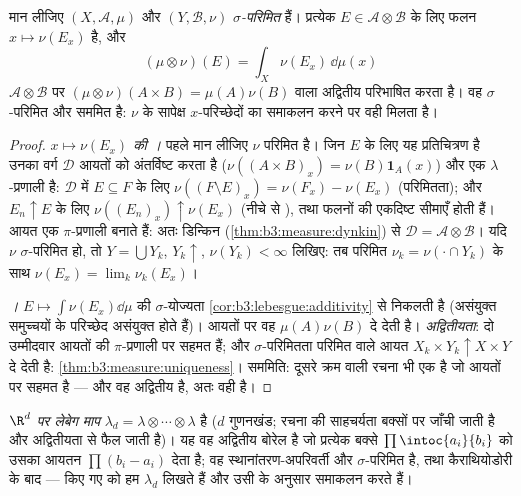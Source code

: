 \begin{theorem}[गुणन माप]\label{thm:b3:product:existence}
मान लीजिए $(X, \mathcal A, \mu)$ और $(Y, \mathcal B, \nu)$ \emph{$\sigma$-परिमित} हैं। प्रत्येक $E \in \mathcal
A\otimes\mathcal B$ के
लिए फलन $x \mapsto \nu(E_x)$  है, और
\[
(\mu\otimes\nu)(E) = \int_X \nu(E_x)\,\dd\mu(x)
\]
$\mathcal A\otimes\mathcal B$ पर $(\mu\otimes\nu)(A\times B) = \mu(A)\nu(B)$ वाला अद्वितीय  परिभाषित करता है। वह $\sigma$-परिमित
और सममित है: $\nu$ के सापेक्ष $x$-परिच्छेदों का समाकलन करने पर
वही  मिलता है।
\end{theorem}

\begin{proof}
\emph{$x \mapsto \nu(E_x)$ की ।} पहले मान लीजिए $\nu$ परिमित है। जिन $E$
के लिए यह प्रतिचित्रण  है उनका वर्ग $\mathcal D$ आयतों को अंतर्विष्ट
करता है ($\nu((A\times B)_x) =
\nu(B)\mathbf 1_A(x)$) और एक $\lambda$-प्रणाली है: $\mathcal D$ में $E
\subseteq F$ के लिए $\nu((F\setminus E)_x) =
\nu(F_x) - \nu(E_x)$
(परिमितता); और $E_n \uparrow E$ के लिए $\nu((E_n)_x) \uparrow \nu(E_x)$ (नीचे से ), तथा 
फलनों की एकदिष्ट सीमाएँ  होती हैं। आयत एक $\pi$-प्रणाली
बनाते हैं: अतः डिन्किन (\cref{thm:b3:measure:dynkin}) से $\mathcal D = \mathcal
A\otimes\mathcal B$। यदि $\nu$ $\sigma$-परिमित हो,
तो $Y =
\bigcup Y_k$, $Y_k \uparrow$, $\nu(Y_k) < \infty$ लिखिए: तब परिमित $\nu_k = \nu(\cdot\cap Y_k)$ के साथ $\nu(E_x) =
\lim_k\nu_k(E_x)$।

\emph{।} $E \mapsto
\int\nu(E_x)\dd\mu$ की $\sigma$-योज्यता \cref{cor:b3:lebesgue:additivity} से निकलती है (असंयुक्त
समुच्चयों के परिच्छेद असंयुक्त होते हैं)। आयतों पर वह $\mu(A)\nu(B)$ दे
देती है। \emph{अद्वितीयता}: दो उम्मीदवार आयतों की $\pi$-प्रणाली
पर सहमत हैं; और $\sigma$-परिमितता परिमित  वाले आयत $X_k\times
Y_k \uparrow X\times Y$ दे देती है:
\cref{thm:b3:measure:uniqueness}। सममिति: दूसरे क्रम वाली रचना भी एक  है जो आयतों पर सहमत
है --- और वह अद्वितीय है, अतः वही है।
\end{proof}

\begin{definition}\label{def:b3:product:lebesgue}
\emph{$\R^d$ पर लेबेग माप} $\lambda_d = \lambda\otimes\cdots\otimes\lambda$ है ($d$
गुणनखंड; रचना की साहचर्यता बक्सों पर जाँची जाती है और अद्वितीयता
से फैल जाती है)। यह वह अद्वितीय बोरेल  है जो प्रत्येक बक्से
$\prod\intoc{a_i}{b_i}$ को उसका आयतन $\prod(b_i - a_i)$ देता है; वह स्थानांतरण-अपरिवर्ती और
$\sigma$-परिमित है, तथा कैराथियोडोरी  के बाद  --- 
किए गए  को हम $\lambda_d$ लिखते हैं और उसी के अनुसार समाकलन करते हैं।
\end{definition}

